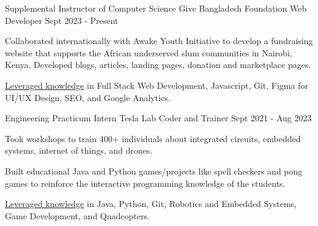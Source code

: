 

\begin{cventries}

\cventryalt
    {Supplemental Instructor of Computer Science} %
    {Give Bangladesh Foundation} %
    {Web Developer} %
    {Sept 2023 - Present} %
    {
      \begin{cvitems}
      \item {Collaborated internationally with Awake Youth Initiative to develop a fundraising website that supports the African underserved slum communities in Nairobi, Kenya. 
      Developed blogs, articles, landing pages, donation and marketplace pages.}
      \item {\underline{Leveraged knowledge} in Full Stack Web Development, Javascript, Git, Figma for UI/UX Design, SEO, and Google Analytics.}
      \end{cvitems}
    }

\cventryalt
    {Engineering Practicum Intern} %
    {Tesla Lab} %
    {Coder and Trainer} %
    {Sept 2021 - Aug 2023} %
    {
      \begin{cvitems}
        \item {Took workshops to train 400+ individuals about integrated circuits, embedded systems, internet of things, and drones.}
        \item {Built educational Java and Python games/projects like spell checkers and pong games to reinforce the interactive programming knowledge of the students.}
        \item {\underline{Leveraged knowledge} in Java, Python, Git, Robotics and Embedded Systems, Game Development, and Quadcopters.}
      \end{cvitems}
    }

\end{cventries}
